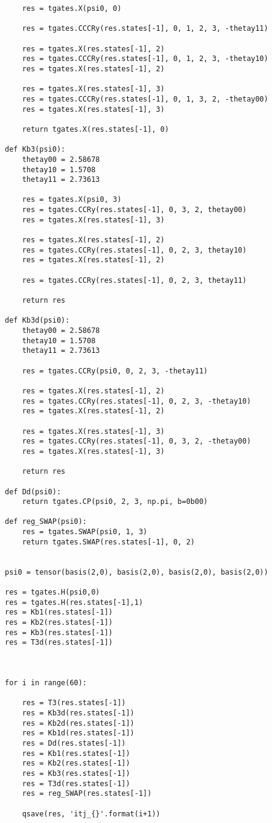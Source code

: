 \begin{verbatim}
    res = tgates.X(psi0, 0)

    res = tgates.CCCRy(res.states[-1], 0, 1, 2, 3, -thetay11)

    res = tgates.X(res.states[-1], 2)
    res = tgates.CCCRy(res.states[-1], 0, 1, 2, 3, -thetay10)
    res = tgates.X(res.states[-1], 2)

    res = tgates.X(res.states[-1], 3)
    res = tgates.CCCRy(res.states[-1], 0, 1, 3, 2, -thetay00)
    res = tgates.X(res.states[-1], 3)

    return tgates.X(res.states[-1], 0)

def Kb3(psi0):
    thetay00 = 2.58678
    thetay10 = 1.5708
    thetay11 = 2.73613

    res = tgates.X(psi0, 3)
    res = tgates.CCRy(res.states[-1], 0, 3, 2, thetay00)
    res = tgates.X(res.states[-1], 3)

    res = tgates.X(res.states[-1], 2)
    res = tgates.CCRy(res.states[-1], 0, 2, 3, thetay10)
    res = tgates.X(res.states[-1], 2)

    res = tgates.CCRy(res.states[-1], 0, 2, 3, thetay11)

    return res

def Kb3d(psi0):
    thetay00 = 2.58678
    thetay10 = 1.5708
    thetay11 = 2.73613

    res = tgates.CCRy(psi0, 0, 2, 3, -thetay11)

    res = tgates.X(res.states[-1], 2)
    res = tgates.CCRy(res.states[-1], 0, 2, 3, -thetay10)
    res = tgates.X(res.states[-1], 2)

    res = tgates.X(res.states[-1], 3)
    res = tgates.CCRy(res.states[-1], 0, 3, 2, -thetay00)
    res = tgates.X(res.states[-1], 3)

    return res

def Dd(psi0):
    return tgates.CP(psi0, 2, 3, np.pi, b=0b00)

def reg_SWAP(psi0):
    res = tgates.SWAP(psi0, 1, 3)
    return tgates.SWAP(res.states[-1], 0, 2)


psi0 = tensor(basis(2,0), basis(2,0), basis(2,0), basis(2,0))

res = tgates.H(psi0,0)
res = tgates.H(res.states[-1],1)
res = Kb1(res.states[-1])
res = Kb2(res.states[-1])
res = Kb3(res.states[-1])
res = T3d(res.states[-1])



for i in range(60):
    
    res = T3(res.states[-1])
    res = Kb3d(res.states[-1])
    res = Kb2d(res.states[-1])
    res = Kb1d(res.states[-1])
    res = Dd(res.states[-1])
    res = Kb1(res.states[-1])
    res = Kb2(res.states[-1])
    res = Kb3(res.states[-1])
    res = T3d(res.states[-1])
    res = reg_SWAP(res.states[-1])
    
    qsave(res, 'itj_{}'.format(i+1))

\end{verbatim}


